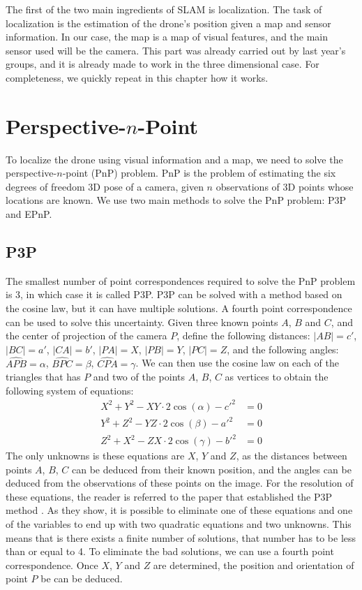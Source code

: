 The first of the two main ingredients of SLAM is localization. The task of localization is the estimation of the drone's position given a map and sensor information. In our case, the map is a map of visual features, and the main sensor used will be the camera. This part was already carried out by last year's groups, and it is already made to work in the three dimensional case. For completeness, we quickly repeat in this chapter how it works.\\

\section{Perspective-$n$-Point}
To localize the drone using visual information and a map, we need to solve the perspective-$n$-point (PnP) problem. PnP is the problem of estimating the six degrees of freedom 3D pose of a camera, given $n$ observations of 3D points whose locations are known. We use two main methods to solve the PnP problem: P3P and EPnP.\\

\subsection{P3P}
The smallest number of point correspondences required to solve the PnP problem is 3, in which case it is called P3P. P3P can be solved with a method based on the cosine law, but it can have multiple solutions. A fourth point correspondence can be used to solve this uncertainty. Given three known points $A$, $B$ and $C$, and the center of projection of the camera $P$, define the following distances: $|A B| = c'$, $|B C| = a'$, $|C A| = b'$, $|P A| = X$, $|P B| = Y$, $|P C| = Z$, and the following angles: $\widehat{APB} = \alpha$, $\widehat{BPC} = \beta$, $\widehat{CPA} = \gamma$. We can then use the cosine law on each of the triangles that has $P$ and two of the points $A$, $B$, $C$ as vertices to obtain the following system of equations:
\begin{align}
  X^2 + Y^2 - XY\cdot2\cos(\alpha) - c'^2 &= 0 \\
  Y^2 + Z^2 - YZ\cdot2\cos(\beta)  - a'^2 &= 0 \\
  Z^2 + X^2 - ZX\cdot2\cos(\gamma) - b'^2 &= 0
\end{align}
The only unknowns is these equations are $X$, $Y$ and $Z$, as the distances between points $A$, $B$, $C$ can be deduced from their known position, and the angles can be deduced from the observations of these points on the image. For the resolution of these equations, the reader is referred to the paper that established the P3P method \cite{p3p}. As they show, it is possible to eliminate one of these equations and one of the variables to end up with two quadratic equations and two unknowns. This means that is there exists a finite number of solutions, that number has to be less than or equal to 4. To eliminate the bad solutions, we can use a fourth point correspondence. Once $X$, $Y$ and $Z$ are determined, the position and orientation of point $P$ be can be deduced.

